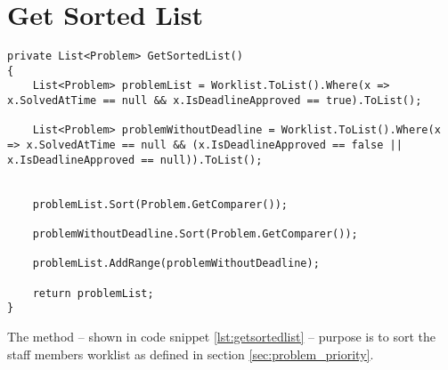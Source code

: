 \section{Get Sorted List}
\label{sec:getsortedlist}



\begin{lstlisting}[style=sourceCode, caption=\myCaption{The GetSortedList method}, label=lst:getsortedlist,float=hp]
private List<Problem> GetSortedList()
{
    List<Problem> problemList = Worklist.ToList().Where(x => x.SolvedAtTime == null && x.IsDeadlineApproved == true).ToList();

    List<Problem> problemWithoutDeadline = Worklist.ToList().Where(x => x.SolvedAtTime == null && (x.IsDeadlineApproved == false || x.IsDeadlineApproved == null)).ToList();


    problemList.Sort(Problem.GetComparer());

    problemWithoutDeadline.Sort(Problem.GetComparer());

    problemList.AddRange(problemWithoutDeadline);

    return problemList;
}
\end{lstlisting}

The  method -- shown in code snippet \ref{lst:getsortedlist} -- purpose is to sort the staff members worklist as defined in section \ref{sec:problem_priority}. 

